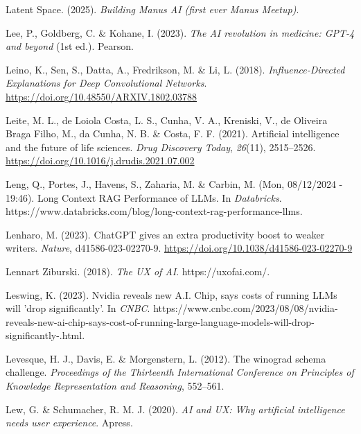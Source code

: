 \documentclass[
  letterpaper,
  DIV=11,
  numbers=noendperiod]{scrartcl}
\newlength{\cslhangindent}
\newenvironment{CSLReferences}[2] %
 {\begin{list}{}{%
  \setlength{\itemindent}{0pt}
  \setlength{\leftmargin}{0pt}
  \setlength{\parsep}{0pt}
  \ifodd #1
   \setlength{\leftmargin}{\cslhangindent}
   \setlength{\itemindent}{-1\cslhangindent}
  \fi
  \setlength{\itemsep}{#2\baselineskip}}}
 {\end{list}}
\begin{document}
\begin{CSLReferences}{1}{0}
Latent Space. (2025). \emph{Building {Manus AI} (first ever {Manus
Meetup})}.

Lee, P., Goldberg, C. \& Kohane, I. (2023). \emph{The {AI} revolution in
medicine: {GPT-4} and beyond} (1st ed.). Pearson.

Leino, K., Sen, S., Datta, A., Fredrikson, M. \& Li, L. (2018).
\emph{Influence-{Directed Explanations} for {Deep Convolutional
Networks}}. \url{https://doi.org/10.48550/ARXIV.1802.03788}

Leite, M. L., de Loiola Costa, L. S., Cunha, V. A., Kreniski, V., de
Oliveira Braga Filho, M., da Cunha, N. B. \& Costa, F. F. (2021).
Artificial intelligence and the future of life sciences. \emph{Drug
Discovery Today}, \emph{26}(11), 2515--2526.
\url{https://doi.org/10.1016/j.drudis.2021.07.002}

Leng, Q., Portes, J., Havens, S., Zaharia, M. \& Carbin, M. (Mon,
08/12/2024 - 19:46). Long {Context RAG Performance} of {LLMs}. In
\emph{Databricks}.
https://www.databricks.com/blog/long-context-rag-performance-llms.

Lenharo, M. (2023). {ChatGPT} gives an extra productivity boost to
weaker writers. \emph{Nature}, d41586-023-02270-9.
\url{https://doi.org/10.1038/d41586-023-02270-9}

Lennart Ziburski. (2018). \emph{The {UX} of {AI}}. https://uxofai.com/.

Leswing, K. (2023). Nvidia reveals new {A}.{I}. Chip, says costs of
running {LLMs} will 'drop significantly'. In \emph{CNBC}.
https://www.cnbc.com/2023/08/08/nvidia-reveals-new-ai-chip-says-cost-of-running-large-language-models-will-drop-significantly-.html.

Levesque, H. J., Davis, E. \& Morgenstern, L. (2012). The winograd
schema challenge. \emph{Proceedings of the Thirteenth International
Conference on Principles of Knowledge Representation and Reasoning},
552--561.

Lew, G. \& Schumacher, R. M. J. (2020). \emph{{AI} and {UX}: Why
artificial intelligence needs user experience}. Apress.


\end{CSLReferences}
\end{document}
